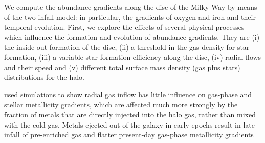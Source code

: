 \documentclass[12pt,a4paper]{article}
\begin{document}
    \citet{mott13} We compute the abundance gradients along the disc of the
    Milky Way by means of the two-infall model: in particular, the gradients of
    oxygen and iron and their temporal evolution. First, we explore the effects
    of several physical processes which influence the formation and evolution
    of abundance gradients. They are (i) the inside-out formation of the disc,
    (ii) a threshold in the gas density for star formation, (iii) a variable
    star formation efficiency along the disc, (iv) radial flows and their speed
    and (v) different total surface mass density (gas plus stars) distributions
    for the halo. 

    \citet{fu13} used simulations to show radial gas inflow has little
    influence on gas-phase and stellar metallicity gradients, which are
    affected much more strongly by the fraction of metals that are directly
    injected into the halo gas, rather than mixed with the cold gas. Metals
    ejected out of the galaxy in early epochs result in late infall of
    pre-enriched gas and flatter present-day gas-phase metallicity gradients
\end{document}
